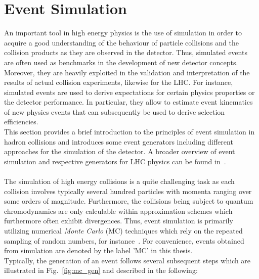 \section{Event Simulation}
\label{sec:simulation}
An important tool in high energy physics is the use of simulation in order to acquire a good understanding of the behaviour of particle collisions and the collision products as they are observed in the detector. Thus, simulated events are often used as benchmarks in the development of new detector concepts. Moreover, they are heavily exploited in the validation and interpretation of the results of actual collision experiments, likewise for the LHC. For instance, simulated events are used to derive expectations for certain physics properties or the detector performance. In particular, they allow to estimate event kinematics of new physics events that can subsequently be used to derive \eg selection efficiencies. \\
This section provides a brief introduction to the principles of event simulation in hadron collisions and introduces some event generators including different approaches for the simulation of the detector. A broader overview of event simulation and respective generators for LHC physics can be found \eg in~\cite{Seymour:2013ega, Buckley:2011ms}. \\
\\
The simulation of high energy collisions is a quite challenging task as each collision involves typically several hundred particles with momenta ranging over some orders of magnitude. Furthermore, the collisions being subject to quantum chromodynamics are only calculable within approximation schemes which furthermore often exhibit divergences. Thus, event simulation is primarily utilizing numerical \textit{Monte Carlo} (MC) techniques which rely on the repeated sampling of random numbers, \cf for instance~\cite{bib:MCMethod}. For convenience, events obtained from simulation are denoted by the label 'MC' in this thesis. \\
Typically, the generation of an event follows several subsequent steps which are illustrated in Fig.~\ref{fig:mc_gen} and described in the following: 
